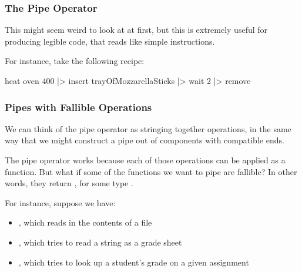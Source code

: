 \documentclass[aspectratio=169]{beamer}
\begin{document}
\begin{frame}[fragile]
  \frametitle{The Pipe Operator}

  This might seem weird to look at at first, but this is extremely useful for
  producing legible code, that reads like simple instructions.

  For instance, take the following recipe:
  \begin{codeblock}
    heat oven 400
    |> insert trayOfMozzarellaSticks
    |> wait 2 
    |> remove
  \end{codeblock}
\end{frame}

\begin{frame}[fragile]
  \frametitle{Pipes with Fallible Operations}

  We can think of the pipe operator as stringing together operations, in the same way
  that we might construct a pipe out of components with compatible ends.

  The pipe operator works because each of those operations can be applied as a function.
  But what if some of the functions we want to pipe are fallible? In other words, they 
  return , for some type .

  For instance, suppose we have:
  \begin{itemize} 
    \item {}, which reads in the contents of a file
    \item {}, which tries to read a string as a grade sheet 
    \item {}, which tries to look up a student's
    grade on a given assignment 
  \end{itemize}
\end{frame}
\end{document}
